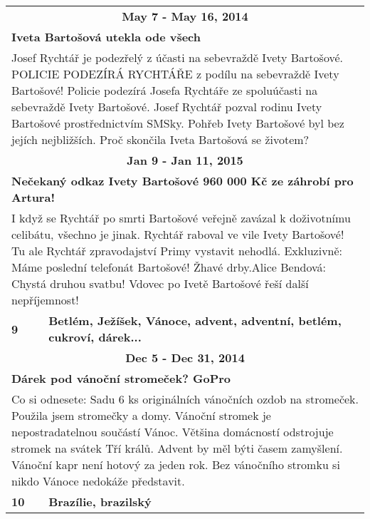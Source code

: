 \begin{tabularx}{\linewidth}{l l}
                \multicolumn{2}{c}{\bf May 7 - May 16, 2014} \\
                \multicolumn{2}{p{\linewidth}}{\bf Iveta Bartošová utekla ode všech} \\
                \multicolumn{2}{p{\linewidth}}{Josef Rychtář je podezřelý z účasti na sebevraždě Ivety Bartošové. POLICIE PODEZÍRÁ RYCHTÁŘE z podílu na sebevraždě Ivety Bartošové! Policie podezírá Josefa Rychtáře ze spoluúčasti na sebevraždě Ivety Bartošové. Josef Rychtář pozval rodinu Ivety Bartošové prostřednictvím SMSky. Pohřeb Ivety Bartošové byl bez jejích nejbližších. Proč skončila Iveta Bartošová se životem?} \\ \midrule
                
                \multicolumn{2}{c}{\bf Jan 9 - Jan 11, 2015} \\
                \multicolumn{2}{p{\linewidth}}{\bf Nečekaný odkaz Ivety Bartošové 960 000 Kč ze záhrobí pro Artura!} \\
                \multicolumn{2}{p{\linewidth}}{I když se Rychtář po smrti Bartošové veřejně zavázal k doživotnímu celibátu, všechno je jinak. Rychtář raboval ve vile Ivety Bartošové! Tu ale Rychtář zpravodajství Primy vystavit nehodlá. Exkluzivně: Máme poslední telefonát Bartošové! Žhavé drby.Alice Bendová: Chystá druhou svatbu! Vdovec po Ivetě Bartošové řeší další nepříjemnost!} \\ \midrule
                [1.5pt]

            \bf 9 & \bf Betlém, Ježíšek, Vánoce, advent, adventní, betlém, cukroví, dárek... \\ \midrule
            
                \multicolumn{2}{c}{\bf Dec 5 - Dec 31, 2014} \\
                \multicolumn{2}{p{\linewidth}}{\bf Dárek pod vánoční stromeček? GoPro} \\
                \multicolumn{2}{p{\linewidth}}{Co si odnesete: Sadu 6 ks originálních vánočních ozdob na stromeček. Použila jsem stromečky a domy. Vánoční stromek je nepostradatelnou součástí Vánoc. Většina domácností odstrojuje stromek na svátek Tří králů. Advent by měl býti časem zamyšlení. Vánoční kapr není hotový za jeden rok. Bez vánočního stromku si nikdo Vánoce nedokáže představit.} \\ \midrule
                [1.5pt]

            \bf 10 & \bf Brazílie, brazilský \\ \midrule
            

\end{tabularx}
